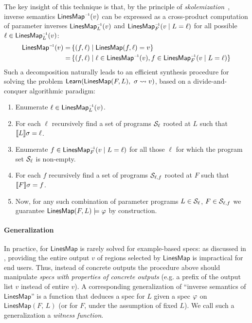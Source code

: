 The key insight of this technique is that, by the principle of \emph{skolemization}~\cite{modeltheory}, inverse
semantics
$\mathsf{LinesMap}^{{\scriptscriptstyle-\!1}}(v)$ can be expressed as a cross-product computation of parameter inverses
$\mathsf{LinesMap}^{{\scriptscriptstyle-\!1}}_L(v)$ and $\mathsf{LinesMap}^{\inv}_F(v \assuming L = \ell)$ for all possible $\ell \in
\mathsf{LinesMap}^{{\scriptscriptstyle-\!1}}_L(v)$:
\begin{gather}
    \begin{aligned}
        \mathsf{LinesMap}^{\inv}(v) = &\left\{(f, \ell) \mid \mathsf{LinesMap}(f, \ell) = v\right\} \\
        = &\left\{(f, \ell) \mid \ell \in \mathsf{LinesMap}^{\inv}(v), f \in \mathsf{LinesMap}^{\inv}_F(v \assuming L = \ell)\right\}
    \end{aligned}
    \label{eqn:derivation:united}
    \raisetag{2\baselineskip}
\end{gather}
Such a decomposition naturally leads to an efficient synthesis procedure for solving the problem
\mbox{$\mathsf{Learn}(\mathsf{LinesMap}(F, L),\ \sigma \rightsquigarrow v)$}, based on a divide-and-conquer
algorithmic paradigm:
\begin{enumerate}[nosep]
    \item Enumerate  $\ell \in \mathsf{LinesMap}_L^{\scriptscriptstyle-\!1} (v)$.
    \item For each $\ell$ recursively find a set of programs $\mathcal{S}_{\ell}$ rooted at $L$ such that
        $\llbracket L \rrbracket{\ensuremath{\sigma}} = \ell$.
    \item Enumerate  $f \in \mathsf{LinesMap}_F^\inv (v \assuming L = \ell)$ for all those $\ell$ for which the program
        set $\mathcal{S}_{\ell}$ is non-empty.
    \item For each $f$ recursively find a set of programs $\mathcal{S}_{\ell,f}$ rooted at $F$ such that $\llbracket F \rrbracket{\ensuremath{\sigma}}
        = f$.
    \item Now, for any such combination of parameter programs $L \in \mathcal{S}_{\ell}$, $F \in \mathcal{S}_{\ell,f}$ we guarantee
        \mbox{$\mathsf{LinesMap}(F, L) \models \varphi$} by construction.
\end{enumerate}

\paragraph{Generalization}
In practice,  for $\mathsf{LinesMap}$ is rarely solved for example-based specs: as
discussed in , providing the entire output $v$ of regions selected by $\mathsf{LinesMap}$ is
impractical for end users.
Thus, instead of concrete outputs the procedure above should manipulate \emph{specs with properties
    of concrete outputs} (e.g.  a prefix of the output list $v$ instead of entire $v$).
A corresponding generalization of ``inverse semantics of $\mathsf{LinesMap}$'' is a function that deduces a
spec for $L$ given a spec $\varphi$ on $\mathsf{LinesMap}(F,\,L)$ (or for $F$, under the assumption of fixed $L$).
We call such a generalization a \emph{witness function}.

